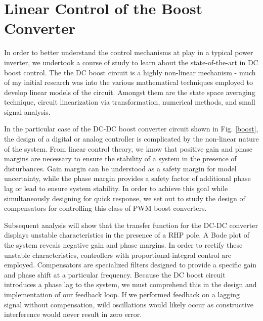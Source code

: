 
\chapter{Linear Control of the Boost Converter} %

\label{Chapter4} %


In order to better understand the control mechanisms at play in a typical power inverter, we undertook a course of study to learn about the state-of-the-art in DC boost control. The the DC boost circuit is a highly non-linear mechanism - much of my initial research was into the various mathematical techniques employed to develop linear models of the circuit. Amongst them are the state space averaging technique, circuit linearization via transformation, numerical methods, and small signal analysis.

In the particular case of the DC-DC boost converter circuit shown in Fig. \ref{boost}, the design of a digital or analog controller is complicated by the non-linear nature of the system. From linear control theory, we know that positive gain and phase margins are necessary to ensure the stability of a system in the presence of disturbances. Gain margin can be understood as a safety margin for model uncertainty, while the phase margin provides a safety factor of additional phase lag or lead to ensure system stability. In order to achieve this goal while simultaneously designing for quick response, we set out to study the design of compensators for controlling this class of PWM boost converters. 

Subsequent analysis will show that the transfer function for the DC-DC converter displays unstable characteristics in the presence of a RHP pole. A Bode plot of the system reveals negative gain and phase margins. In order to rectify these unstable characteristics, controllers with proportional-integral control are employed. Compensators are specialized filters designed to provide a specific gain and phase shift at a particular frequency. Because the DC boost circuit introduces a phase lag to the system, we must comprehend this in the design and implementation of our feedback loop. If we performed feedback on a lagging signal without compensation, wild oscillations would likely occur as constructive interference would never result in zero error. 

